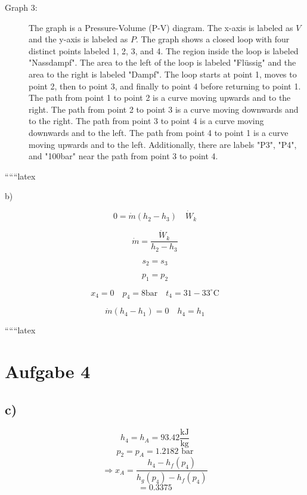\begin{description}
    \item[Graph 3:] 
    The graph is a Pressure-Volume (P-V) diagram. The x-axis is labeled as $V$ and the y-axis is labeled as $P$. The graph shows a closed loop with four distinct points labeled 1, 2, 3, and 4. The region inside the loop is labeled "Nassdampf". The area to the left of the loop is labeled "Flüssig" and the area to the right is labeled "Dampf". The loop starts at point 1, moves to point 2, then to point 3, and finally to point 4 before returning to point 1. The path from point 1 to point 2 is a curve moving upwards and to the right. The path from point 2 to point 3 is a curve moving downwards and to the right. The path from point 3 to point 4 is a curve moving downwards and to the left. The path from point 4 to point 1 is a curve moving upwards and to the left. Additionally, there are labels "P3", "P4", and "100bar" near the path from point 3 to point 4.
\end{description}

``````latex


b) \quad {}

\[
0 = \dot{m} (h_2 - h_3) \quad \dot{W}_k
\]


\[
\dot{m} = \frac{\dot{W}_k}{h_2 - h_3}
\]

\[
s_2 = s_3
\]

\[
p_1 = p_2
\]

\[
x_4 = 0 \quad p_4 = 8 \text{bar} \quad t_4 = 31-33^\circ \text{C}
\]


\[
\dot{m} (h_4 - h_1) = 0 \quad h_4 = h_1
\]

``````latex


\section*{Aufgabe 4}

\subsection*{c)}
\[
h_4 = h_{A} = 93.42 \frac{\text{kJ}}{\text{kg}}
\]
\[
p_2 = p_{A} = 1.2182 \text{ bar}
\]
\[
\Rightarrow x_{A} = \frac{h_4 - h_f(p_4)}{h_g(p_4) - h_f(p_4)}
\]
\[
= 0.3375
\]

